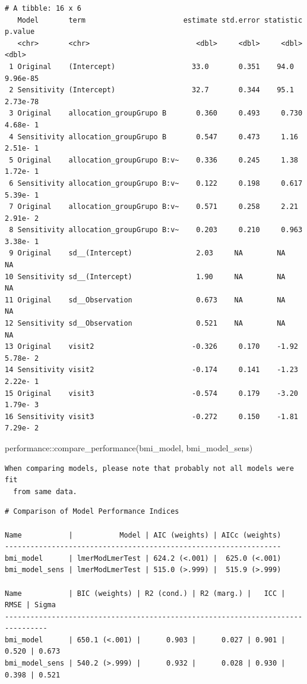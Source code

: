 \documentclass[
  letterpaper,
  DIV=11,
  numbers=noendperiod]{scrartcl}
\newenvironment{Shaded}{\begin{snugshade}}{\end{snugshade}}
\newcommand{\FunctionTok}[1]{\textcolor[rgb]{0.28,0.35,0.67}{#1}}
\newcommand{\NormalTok}[1]{\textcolor[rgb]{0.00,0.23,0.31}{#1}}
\newcommand{\SpecialCharTok}[1]{\textcolor[rgb]{0.37,0.37,0.37}{#1}}
\begin{document}
\begin{verbatim}
# A tibble: 16 x 6
   Model       term                       estimate std.error statistic   p.value
   <chr>       <chr>                         <dbl>     <dbl>     <dbl>     <dbl>
 1 Original    (Intercept)                  33.0       0.351    94.0    9.96e-85
 2 Sensitivity (Intercept)                  32.7       0.344    95.1    2.73e-78
 3 Original    allocation_groupGrupo B       0.360     0.493     0.730  4.68e- 1
 4 Sensitivity allocation_groupGrupo B       0.547     0.473     1.16   2.51e- 1
 5 Original    allocation_groupGrupo B:v~    0.336     0.245     1.38   1.72e- 1
 6 Sensitivity allocation_groupGrupo B:v~    0.122     0.198     0.617  5.39e- 1
 7 Original    allocation_groupGrupo B:v~    0.571     0.258     2.21   2.91e- 2
 8 Sensitivity allocation_groupGrupo B:v~    0.203     0.210     0.963  3.38e- 1
 9 Original    sd__(Intercept)               2.03     NA        NA     NA       
10 Sensitivity sd__(Intercept)               1.90     NA        NA     NA       
11 Original    sd__Observation               0.673    NA        NA     NA       
12 Sensitivity sd__Observation               0.521    NA        NA     NA       
13 Original    visit2                       -0.326     0.170    -1.92   5.78e- 2
14 Sensitivity visit2                       -0.174     0.141    -1.23   2.22e- 1
15 Original    visit3                       -0.574     0.179    -3.20   1.79e- 3
16 Sensitivity visit3                       -0.272     0.150    -1.81   7.29e- 2
\end{verbatim}

\begin{Shaded}
\begin{Highlighting}[]
\NormalTok{performance}\SpecialCharTok{::}\FunctionTok{compare\_performance}\NormalTok{(bmi\_model, bmi\_model\_sens)}
\end{Highlighting}
\end{Shaded}

\begin{verbatim}
When comparing models, please note that probably not all models were fit
  from same data.
\end{verbatim}

\begin{verbatim}
# Comparison of Model Performance Indices

Name           |           Model | AIC (weights) | AICc (weights)
-----------------------------------------------------------------
bmi_model      | lmerModLmerTest | 624.2 (<.001) |  625.0 (<.001)
bmi_model_sens | lmerModLmerTest | 515.0 (>.999) |  515.9 (>.999)

Name           | BIC (weights) | R2 (cond.) | R2 (marg.) |   ICC |  RMSE | Sigma
--------------------------------------------------------------------------------
bmi_model      | 650.1 (<.001) |      0.903 |      0.027 | 0.901 | 0.520 | 0.673
bmi_model_sens | 540.2 (>.999) |      0.932 |      0.028 | 0.930 | 0.398 | 0.521
\end{verbatim}
\end{document}
